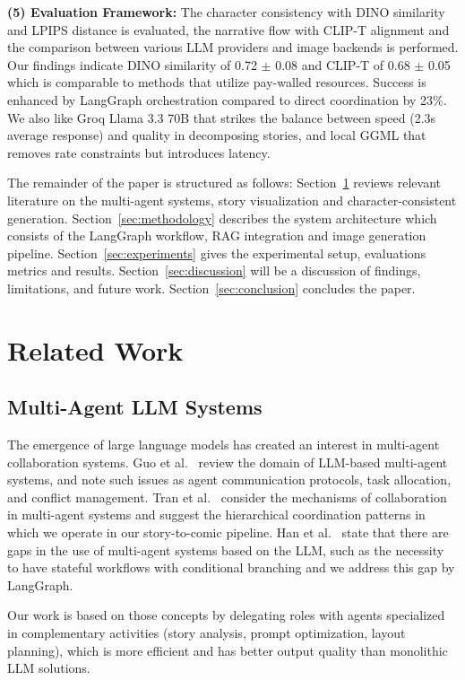 \documentclass[runningheads]{llncs}
\begin{document}
\textbf{(5) Evaluation Framework:} The character consistency with DINO similarity and LPIPS distance is evaluated, the narrative flow with CLIP-T alignment and the comparison between various LLM providers and image backends is performed. Our findings indicate DINO similarity of 0.72 $\pm$ 0.08 and CLIP-T of 0.68 $\pm$ 0.05 which is comparable to methods that utilize pay-walled resources. Success is enhanced by LangGraph orchestration compared to direct coordination by 23\%. We also like Groq Llama 3.3 70B that strikes the balance between speed (2.3s average response) and quality in decomposing stories, and local GGML that removes rate constraints but introduces latency.

The remainder of the paper is structured as follows: Section~\ref{sec:related} reviews relevant literature on the multi-agent systems, story visualization and character-consistent generation. Section~\ref{sec:methodology} describes the system architecture which consists of the LangGraph workflow, RAG integration and image generation pipeline. Section~\ref{sec:experiments} gives the experimental setup, evaluations metrics and results. Section~\ref{sec:discussion} will be a discussion of findings, limitations, and future work. Section~\ref{sec:conclusion} concludes the paper.

\section{Related Work}
\label{sec:related}

\subsection{Multi-Agent LLM Systems}

The emergence of large language models has created an interest in multi-agent collaboration systems. Guo et al.~\cite{guo2024llm} review the domain of LLM-based multi-agent systems, and note such issues as agent communication protocols, task allocation, and conflict management. Tran et al.~\cite{tran2025multiagent} consider the mechanisms of collaboration in multi-agent systems and suggest the hierarchical coordination patterns in which we operate in our story-to-comic pipeline. Han et al.~\cite{han2024llm} state that there are gaps in the use of multi-agent systems based on the LLM, such as the necessity to have stateful workflows with conditional branching and we address this gap by LangGraph.

Our work is based on those concepts by delegating roles with agents specialized in complementary activities (story analysis, prompt optimization, layout planning), which is more efficient and has better output quality than monolithic LLM solutions.
\end{document}
